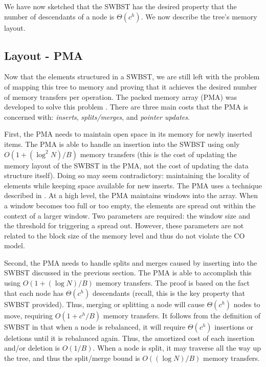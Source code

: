 \documentclass[preprint]{style}
\begin{document}
We have now sketched that the SWBST has the desired property that the number of
descendants of a node is $\Theta(c^h)$. We now describe the tree's memory layout.

\subsection{Layout - PMA}
\label{sec:layout}

Now that the elements structured in a SWBST, we are still left with the problem
of mapping this tree to memory and proving that it achieves the desired number
of memory transfers per operation. The packed memory array (PMA) was developed
to solve this problem \cite{BenderDemainColton}. There are three main costs
that the PMA is concerned with: \textit{inserts}, \textit{splits/merges}, and
\textit{pointer updates}.

First, the PMA needs to maintain open space in its memory for newly inserted
items. The PMA is able to handle an insertion into the SWBST using only $O(1 +
(\log^2{N}) / B)$ memory transfers (this is the cost of updating the memory
layout of the SWBST in the PMA, not the cost of updating the data structure
itself). Doing so may seem contradictory: maintaining the locality of elements
while keeping space available for new inserts. The PMA uses a technique
described in \cite{packedmemoryarray}. At a high level, the PMA maintains
windows into the array. When a window becomes too full or too empty, the
elements are spread out within the context of a larger window. Two parameters
are required: the window size and the threshold for triggering a spread out.
However, these parameters are not related to the block size of the memory level
and thus do not violate the CO model. 

Second, the PMA needs to handle splits and merges caused by inserting into the
SWBST discussed in the previous section. The PMA is able to accomplish this
using $O(1 + (\log{N}) /B)$ memory transfers. The proof is based on the fact
that each node has $\Theta(c^h)$ descendants (recall, this is the key property
that SWBST provided). Thus, merging or splitting a node will cause
$\Theta(c^h)$ nodes to move, requiring $O(1 + c^h/B)$ memory transfers. It
follows from the definition of SWBST in \cite{swbst} that when a node is
rebalanced, it will require $\Theta(c^h)$ insertions or deletions until it is
rebalanced again. Thus, the amortized cost of each insertion and/or deletion is
$O(1/B)$. When a node is split, it may traverse all the way up the tree, and
thus the split/merge bound is $O((\log N) / B)$ memory transfers.
\end{document}
